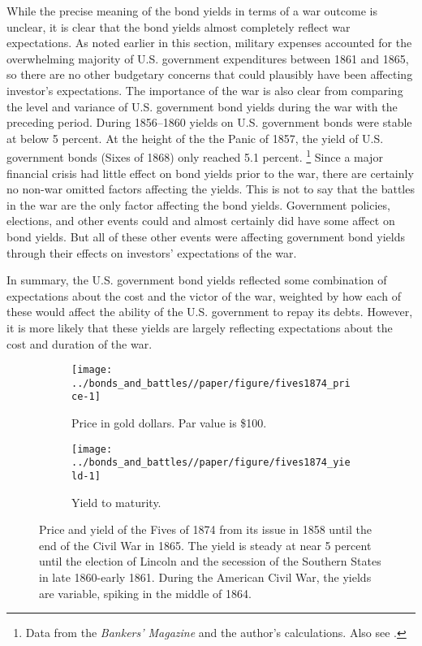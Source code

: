 
While the precise meaning of the bond yields in terms of a war outcome is unclear, it is clear that the bond yields almost completely reflect war expectations.
As noted earlier in this section, military expenses accounted for the overwhelming majority of U.S. government expenditures between 1861 and 1865, so there are no other budgetary concerns that could plausibly have been affecting investor's expectations.
The importance of the war is also clear from comparing the level and variance of U.S. government bond yields during the war with the preceding period.
During 1856--1860 yields on U.S. government bonds were stable at below 5 percent.
At the height of the the Panic of 1857, the yield of U.S. government bonds (Sixes of 1868) only reached 5.1 percent.%
\footnote{Data from the \textit{Bankers' Magazine} and the author's calculations. Also see \textcite{HomerSylla2005}.}
Since a major financial crisis had little effect on bond yields prior to the war, there are certainly no non-war omitted factors affecting the yields.
This is not to say that the battles in the war are the only factor affecting the bond yields.
Government policies, elections, and other events could and almost certainly did have some affect on bond yields.
But all of these other events were affecting government bond yields through their effects on investors' expectations of the war.

In summary, the U.S. government bond yields reflected some combination of expectations about the cost and the victor of the war, weighted by how each of these would affect the ability of the U.S. government to repay its debts.
However, it is more likely that these yields are largely reflecting expectations about the cost and duration of the war.

\begin{figure}[!htpb]
  \centering
  \begin{subfigure}[b]{\linewidth}
   \texttt{[image: ../bonds\_and\_battles//paper/figure/fives1874\_price-1]}
  \caption{Price in gold dollars. Par value is \$100.}
  \label{bonds:fig:fives1874_price}
\end{subfigure}
\begin{subfigure}[b]{\linewidth}
   \texttt{[image: ../bonds\_and\_battles//paper/figure/fives1874\_yield-1]}
  \caption{Yield to maturity.}
  \label{bonds:fig:fives1874_yield}
\end{subfigure}
\caption[Price and yield of the Fives of 1874, 1858-1865]{Price and yield of the Fives of 1874 from its issue in 1858 until the end of the Civil War in 1865.
The yield is steady at near 5 percent until the election of Lincoln and the secession of the Southern States in late 1860-early 1861.
During the American Civil War, the yields are variable, spiking in the middle of 1864.
 }
\label{bonds:fig:fives1874_yield_price}
\end{figure}

